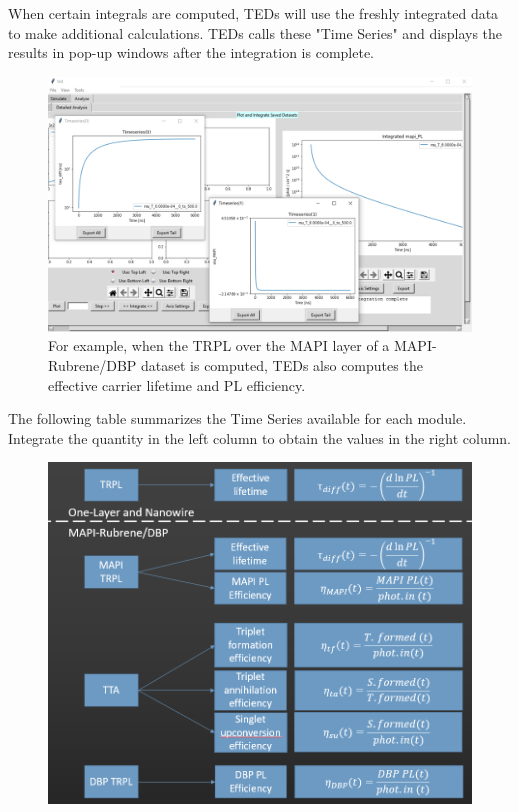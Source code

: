 \documentclass[11pt,letterpaper,titlepage]{article}
\begin{document}
		\par When certain integrals are computed, TEDs will use the freshly integrated data to make additional calculations. TEDs calls these "Time Series" and displays the results in pop-up windows after the integration is complete.
		
		\begin{figure}[H]
			\label{fig:timeseries_example}
			\centering
			\includegraphics[scale=0.38]{"timeseries"}
			\caption{For example, when the TRPL over the MAPI layer of a MAPI-Rubrene/DBP dataset is computed, TEDs also computes the effective carrier lifetime and PL efficiency.}
		\end{figure}
	
		\par The following table summarizes the Time Series available for each module. Integrate the quantity in the left column to obtain the values in the right column.
		
		\begin{figure}[H]
			\label{fig:timeseries_table}
			\centering
			\includegraphics[scale=0.6]{"timeseries_table"}
		\end{figure}
	
\end{document}
